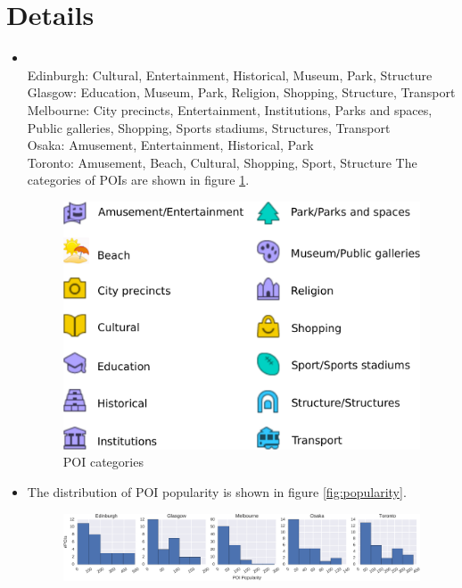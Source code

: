 \appendix
\section{Details}
\begin{itemize}
\item {} \\
      Edinburgh: Cultural, Entertainment, Historical, Museum, Park, Structure \\
      Glasgow: Education, Museum, Park, Religion, Shopping, Structure, Transport \\
      Melbourne: City precincts, Entertainment, Institutions, Parks and spaces, Public galleries, Shopping, 
                 Sports stadiums, Structures, Transport \\
      Osaka: Amusement, Entertainment, Historical, Park \\
      Toronto: Amusement, Beach, Cultural, Shopping, Sport, Structure 
      The categories of POIs are shown in figure \ref{fig:poicats}.
      \begin{figure}
      \includegraphics[width=\columnwidth]{fig/poi_cats.pdf}
      \caption{POI categories}
      \label{fig:poicats}
      \end{figure}
\item The distribution of POI popularity is shown in figure \ref{fig:popularity}.
      \begin{figure}
      \includegraphics[width=\textwidth]{fig/poi_popularity.pdf}

\end{figure}
\end{itemize}
